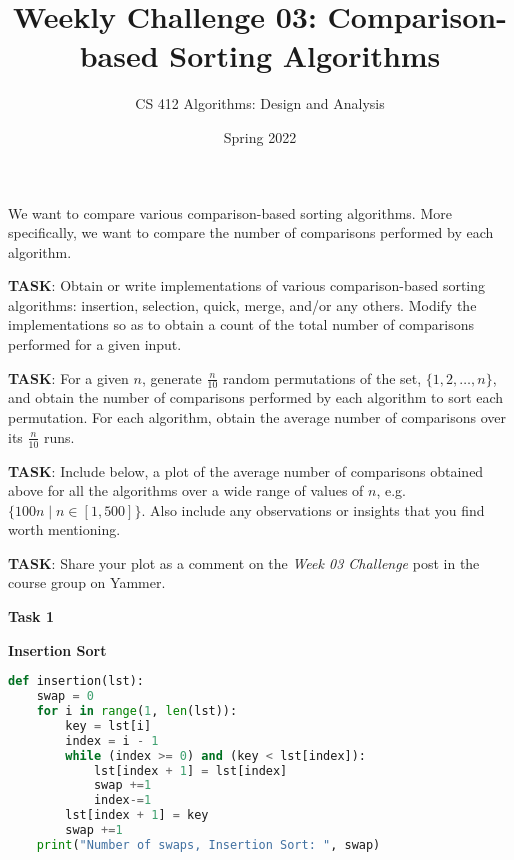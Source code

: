 \documentclass[a4paper]{exam}
\title{Weekly Challenge 03: Comparison-based Sorting Algorithms}
\author{CS 412 Algorithms: Design and Analysis}
\date{Spring 2022}
\begin{document}
\maketitle

\begin{questions}
  
\question We want to compare various comparison-based sorting algorithms. More specifically, we want to compare the number of comparisons performed by each algorithm.

  \noindent\textbf{TASK}: Obtain or write implementations of various comparison-based sorting algorithms: insertion, selection, quick, merge, and/or any others. Modify the implementations so as to obtain a count of the total number of comparisons performed for a given input.

  \noindent\textbf{TASK}: For a given $n$, generate $\frac{n}{10}$ random permutations of the set, $\{1,2,\ldots,n\}$, and obtain the number of comparisons performed by each algorithm to sort each permutation. For each algorithm, obtain the average number of comparisons over its $\frac{n}{10}$ runs.

  \noindent\textbf{TASK}: Include below, a plot of the average number of comparisons obtained above for all the algorithms over a wide range of values of $n$, e.g. $\{100n \mid n\in [1,500] \}$. Also include any observations or insights that you find worth mentioning.

  \noindent\textbf{TASK}: Share your plot as a comment on the \textit{Week 03 Challenge} post in the course group on Yammer.

  \begin{solution}
   \begin{center}
       \textbf{Task 1}
   \end{center}
   \textbf{Insertion Sort}
   \begin{lstlisting}[language=Python, caption=Insertion Sort with Swaps]
def insertion(lst):
    swap = 0
    for i in range(1, len(lst)):
        key = lst[i]
        index = i - 1
        while (index >= 0) and (key < lst[index]):
            lst[index + 1] = lst[index]
            swap +=1
            index-=1
        lst[index + 1] = key
        swap +=1
    print("Number of swaps, Insertion Sort: ", swap)
   \end{lstlisting}
   

\end{solution}
\end{questions}
\end{document}
